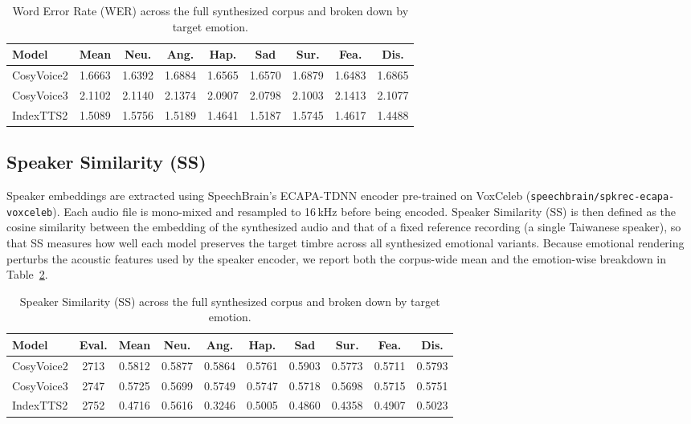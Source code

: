 \begin{table}[htbp]
\centering
\small
\caption{Word Error Rate (WER) across the full synthesized corpus and broken down by target emotion.}
\label{tab:wer_results}
\setlength{\tabcolsep}{3pt}
\begin{tabular}{lcccccccc}
\toprule
\textbf{Model} & \textbf{Mean} & \textbf{Neu.} & \textbf{Ang.} & \textbf{Hap.} & \textbf{Sad} & \textbf{Sur.} & \textbf{Fea.} & \textbf{Dis.} \\
\midrule
CosyVoice2 & 1.6663 & 1.6392 & 1.6884 & 1.6565 & 1.6570 & 1.6879 & 1.6483 & 1.6865 \\
CosyVoice3 & 2.1102 & 2.1140 & 2.1374 & 2.0907 & 2.0798 & 2.1003 & 2.1413 & 2.1077 \\
IndexTTS2 & 1.5089 & 1.5756 & 1.5189 & 1.4641 & 1.5187 & 1.5745 & 1.4617 & 1.4488 \\
\bottomrule
\end{tabular}
\end{table}

\subsection{Speaker Similarity (SS)}
\label{section:exp:ss}
Speaker embeddings are extracted using SpeechBrain's ECAPA-TDNN encoder pre-trained on VoxCeleb (\texttt{speechbrain/spkrec-ecapa-voxceleb}). Each audio file is mono-mixed and resampled to 16\,kHz before being encoded. Speaker Similarity (SS) is then defined as the cosine similarity between the embedding of the synthesized audio and that of a fixed reference recording (a single Taiwanese speaker), so that SS measures how well each model preserves the target timbre across all synthesized emotional variants. Because emotional rendering perturbs the acoustic features used by the speaker encoder, we report both the corpus-wide mean and the emotion-wise breakdown in Table~\ref{tab:ss_by_emotion}.

\begin{table}[htbp]
\centering
\small
\caption{Speaker Similarity (SS) across the full synthesized corpus and broken down by target emotion.}
\label{tab:ss_by_emotion}
\setlength{\tabcolsep}{3pt}
\begin{tabular}{lccccccccc}
\toprule
\textbf{Model} & \textbf{Eval.} & \textbf{Mean} & \textbf{Neu.} & \textbf{Ang.} & \textbf{Hap.} & \textbf{Sad} & \textbf{Sur.} & \textbf{Fea.} & \textbf{Dis.} \\
\midrule
CosyVoice2 & 2713 & 0.5812 & 0.5877 & 0.5864 & 0.5761 & 0.5903 & 0.5773 & 0.5711 & 0.5793 \\
CosyVoice3 & 2747 & 0.5725 & 0.5699 & 0.5749 & 0.5747 & 0.5718 & 0.5698 & 0.5715 & 0.5751 \\
IndexTTS2 & 2752 & 0.4716 & 0.5616 & 0.3246 & 0.5005 & 0.4860 & 0.4358 & 0.4907 & 0.5023 \\
\bottomrule
\end{tabular}
\end{table}

